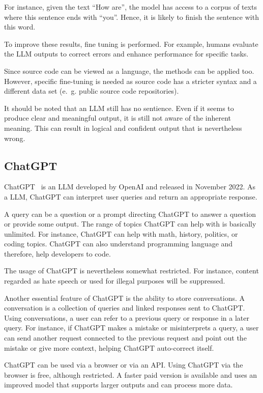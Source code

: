 For instance, given the text \enquote{How are}, the model  has access to a corpus of texts where this sentence ends with \enquote{you}. Hence, it is likely to finish the sentence with this word. 

To improve these results, fine tuning is performed.  For example, humans evaluate the \ac{LLM} outputs to correct errors and enhance performance for specific tasks.



Since source code can be viewed as a language, the methods can be applied too. However, specific fine-tuning is needed as source code  has a stricter syntax and a different data set (e.~g. public source code repositories).

It should be noted that an \ac{LLM} still has no sentience. Even if it seems to produce clear and meaningful output, it is still not aware of the inherent meaning. This can result in logical and confident output that is nevertheless wrong.~\cite{Amaratunga2023}


\subsection{ChatGPT}
\label{sec:chatgpt}


ChatGPT~\cite{ChatGPT_url} is an \ac{LLM} developed by OpenAI and released in November 2022. As a \ac{LLM}, ChatGPT can interpret user queries and return an appropriate response. 

A query can be a question or a prompt directing ChatGPT to answer a question or provide some output. The range of topics ChatGPT can help with is basically unlimited. For instance, ChatGPT can help with math, history, politics, or coding topics. ChatGPT can also understand programming language and therefore, help developers to code.  

The usage of ChatGPT is nevertheless somewhat restricted. For instance, content regarded as hate speech or used for illegal purposes will be suppressed.

Another essential feature of ChatGPT is the ability to store conversations. A conversation is a collection of queries and linked responses sent to ChatGPT. Using conversations, a user can refer to a previous query or response in a later query. For instance, if ChatGPT makes a mistake or misinterprets a query, a user can send another request connected to the previous request and point out the mistake or give more context, helping ChatGPT auto-correct itself. 

ChatGPT can be used via a browser or via an \ac{API}. Using ChatGPT via the browser is free, although restricted. A faster paid version is available and uses an improved model that supports larger outputs and can process more data.

